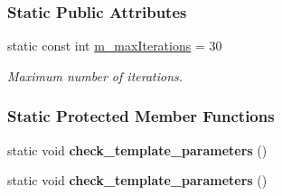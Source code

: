\subsubsection*{Static Public Attributes}
\begin{DoxyCompactItemize}
\item 
static const int \hyperlink{group___eigenvalues___module_a0567341a66a61e2c8891f7cdd1e4505c}{m\+\_\+max\+Iterations} = 30
\begin{DoxyCompactList}\small\item\em Maximum number of iterations. \end{DoxyCompactList}\end{DoxyCompactItemize}
\subsubsection*{Static Protected Member Functions}
\begin{DoxyCompactItemize}
\item 
\mbox{\label{group___eigenvalues___module_a8992bfdbf1c6dbdd44dc8c4cfa1467a6}} 
static void {\bfseries check\+\_\+template\+\_\+parameters} ()
\item 
\mbox{\label{group___eigenvalues___module_a8992bfdbf1c6dbdd44dc8c4cfa1467a6}} 
static void {\bfseries check\+\_\+template\+\_\+parameters} ()
\end{DoxyCompactItemize}
